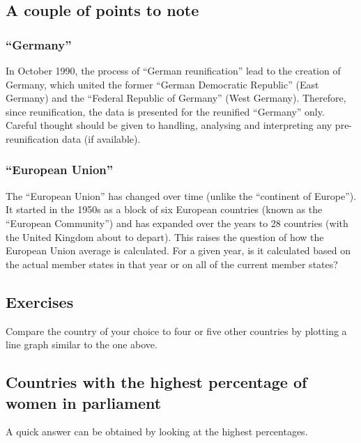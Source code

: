 \documentclass[a4paper,9pt,twocolumn,twoside,printwatermark=false]{pinp}
\begin{document}
\subsection{A couple of points to
note}\label{a-couple-of-points-to-note}

\subsubsection{\texorpdfstring{``Germany''}{Germany}}\label{germany}

In October 1990, the process of ``German reunification'' lead to the
creation of Germany, which united the former ``German Democratic
Republic'' (East Germany) and the ``Federal Republic of Germany'' (West
Germany). Therefore, since reunification, the data is presented for the
reunified ``Germany'' only. Careful thought should be given to handling,
analysing and interpreting any pre-reunification data (if available).

\subsubsection{\texorpdfstring{``European
Union''}{European Union}}\label{european-union}

The ``European Union'' has changed over time (unlike the ``continent of
Europe''). It started in the 1950s as a block of six European countries
(known as the ``European Community'') and has expanded over the years to
28 countries (with the United Kingdom about to depart). This raises the
question of how the European Union average is calculated. For a given
year, is it calculated based on the actual member states in that year or
on all of the current member states?

\subsection{Exercises}\label{exercises}

Compare the country of your choice to four or five other countries by
plotting a line graph similar to the one above.

\subsection{Countries with the highest percentage of women in
parliament}\label{countries-with-the-highest-percentage-of-women-in-parliament}

A quick answer can be obtained by looking at the highest percentages.
\end{document}
